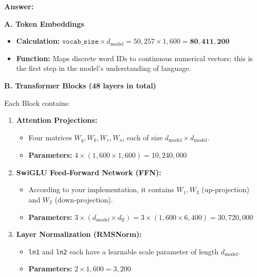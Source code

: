 \begin{answerbox}
    \textbf{Answer:}

    \textbf{A. Token Embeddings}
    \begin{itemize}[itemsep=0.5em, parsep=0pt, topsep=0.5em]
        \item \textbf{Calculation:} $\texttt{vocab\_size} \times d_{\mathrm{model}} = 50,257 \times 1,600 = \mathbf{80,411,200}$
        \item \textbf{Function:} Maps discrete word IDs to continuous numerical vectors; this is the first step in the model's understanding of language.
    \end{itemize}

    \vspace{1em}
    \textbf{B. Transformer Blocks (48 layers in total)}

    Each Block contains:
    \begin{enumerate}
        \item \textbf{Attention Projections:}
              \begin{itemize}[itemsep=0.2em, parsep=0pt, topsep=0.2em]
                  \item Four matrices $W_q, W_k, W_v, W_o$, each of size $d_{\mathrm{model}} \times d_{\mathrm{model}}$.
                  \item \textbf{Parameters:} $4 \times (1,600 \times 1,600) = 10,240,000$
              \end{itemize}

        \item \textbf{SwiGLU Feed-Forward Network (FFN):}
              \begin{itemize}[itemsep=0.2em, parsep=0pt, topsep=0.2em]
                  \item According to your implementation, it contains $W_1, W_3$ (up-projection) and $W_2$ (down-projection).
                  \item \textbf{Parameters:} $3 \times (d_{\mathrm{model}} \times d_{\mathrm{ff}}) = 3 \times (1,600 \times 6,400) = 30,720,000$
              \end{itemize}

        \item \textbf{Layer Normalization (RMSNorm):}
              \begin{itemize}[itemsep=0.2em, parsep=0pt, topsep=0.2em]
                  \item \texttt{ln1} and \texttt{ln2} each have a learnable scale parameter of length $d_{\mathrm{model}}$.
                  \item \textbf{Parameters:} $2 \times 1,600 = 3,200$
              \end{itemize}
    \end{enumerate}


\end{answerbox}
